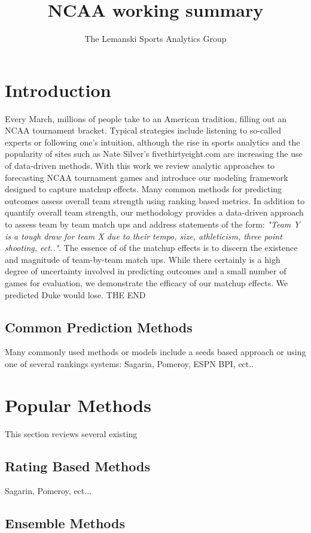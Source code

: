 \documentclass[11pt]{article} %
\title{NCAA working summary}
\author{The Lemanski Sports Analytics Group}
\begin{document}
\maketitle

\section{Introduction}
 Every March, millions of people take to an American tradition, filling out an NCAA tournament bracket.  Typical strategies include listening to so-called experts or following one's intuition, although the rise in sports analytics and the popularity of sites such as Nate Silver's fivethirtyeight.com are increasing the use of data-driven methods.  With this work we review analytic approaches to forecasting NCAA tournament games and introduce our modeling framework designed to capture matchup effects.   Many common methods for predicting outcomes assess overall team strength using ranking based metrics.  In addition to quantify overall team strength, our methodology provides a data-driven approach to assess team by team match ups and address statements of the form: \emph{"Team Y is a tough draw for team X due to their tempo, size, athleticism, three point shooting, ect.."}.  The essence of of the matchup effects is to discern the existence and magnitude of team-by-team match ups.  While there certainly is a high degree of uncertainty involved in predicting outcomes and a small number of games for evaluation, we demonstrate the efficacy of our matchup effects.  We predicted Duke would lose.  THE END
\subsection{Common Prediction Methods}
Many commonly used methods or models include a seeds based approach or using one of several rankings systems: Sagarin, Pomeroy, ESPN BPI, ect..
\section{Popular Methods}  This section reviews several existing
\subsection{Rating Based Methods} Sagarin, Pomeroy, ect...
\subsection{Ensemble Methods}
\end{document}
